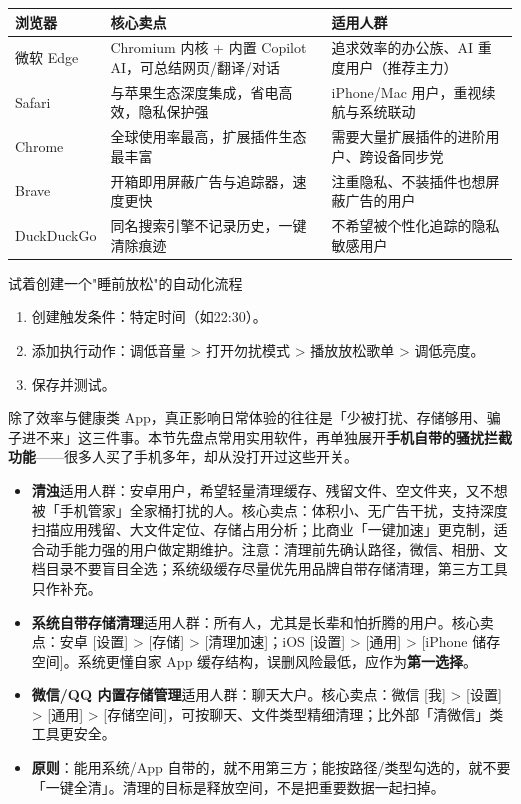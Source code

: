 
\begin{center}
\begin{tabularx}{\linewidth}{|X|X|X|}
\hline
\textbf{浏览器} & \textbf{核心卖点} & \textbf{适用人群} \tabularnewline
\hline
微软 Edge & Chromium 内核 + 内置 Copilot AI，可总结网页/翻译/对话 & 追求效率的办公族、AI 重度用户（推荐主力） \tabularnewline
Safari & 与苹果生态深度集成，省电高效，隐私保护强 & iPhone/Mac 用户，重视续航与系统联动 \tabularnewline
Chrome & 全球使用率最高，扩展插件生态最丰富 & 需要大量扩展插件的进阶用户、跨设备同步党 \tabularnewline
Brave & 开箱即用屏蔽广告与追踪器，速度更快 & 注重隐私、不装插件也想屏蔽广告的用户 \tabularnewline
DuckDuckGo & 同名搜索引擎不记录历史，一键清除痕迹 & 不希望被个性化追踪的隐私敏感用户 \tabularnewline
\hline
\end{tabularx}
\end{center}

\begin{tcbpractice}{试着创建一个"睡前放松"的自动化流程}
\begin{enumerate}
  \item 创建触发条件：特定时间（如22:30）。
  \item 添加执行动作：调低音量 > 打开勿扰模式 > 播放放松歌单 > 调低亮度。
  \item 保存并测试。
\end{enumerate}

\end{tcbpractice}


除了效率与健康类 App，真正影响日常体验的往往是「少被打扰、存储够用、骗子进不来」这三件事。本节先盘点常用实用软件，再单独展开\textbf{手机自带的骚扰拦截功能}——很多人买了手机多年，却从没打开过这些开关。


\begin{itemize}
  \item \textbf{清浊}适用人群：安卓用户，希望轻量清理缓存、残留文件、空文件夹，又不想被「手机管家」全家桶打扰的人。核心卖点：体积小、无广告干扰，支持深度扫描应用残留、大文件定位、存储占用分析；比商业「一键加速」更克制，适合动手能力强的用户做定期维护。注意：清理前先确认路径，微信、相册、文档目录不要盲目全选；系统级缓存尽量优先用品牌自带存储清理，第三方工具只作补充。
  \item \textbf{系统自带存储清理}适用人群：所有人，尤其是长辈和怕折腾的用户。核心卖点：安卓 [设置] > [存储] > [清理加速]；iOS [设置] > [通用] > [iPhone 储存空间]。系统更懂自家 App 缓存结构，误删风险最低，应作为\textbf{第一选择}。
  \item \textbf{微信/QQ 内置存储管理}适用人群：聊天大户。核心卖点：微信 [我] > [设置] > [通用] > [存储空间]，可按聊天、文件类型精细清理；比外部「清微信」类工具更安全。
  \item \textbf{原则}：能用系统/App 自带的，就不用第三方；能按路径/类型勾选的，就不要「一键全清」。清理的目标是释放空间，不是把重要数据一起扫掉。
\end{itemize}

